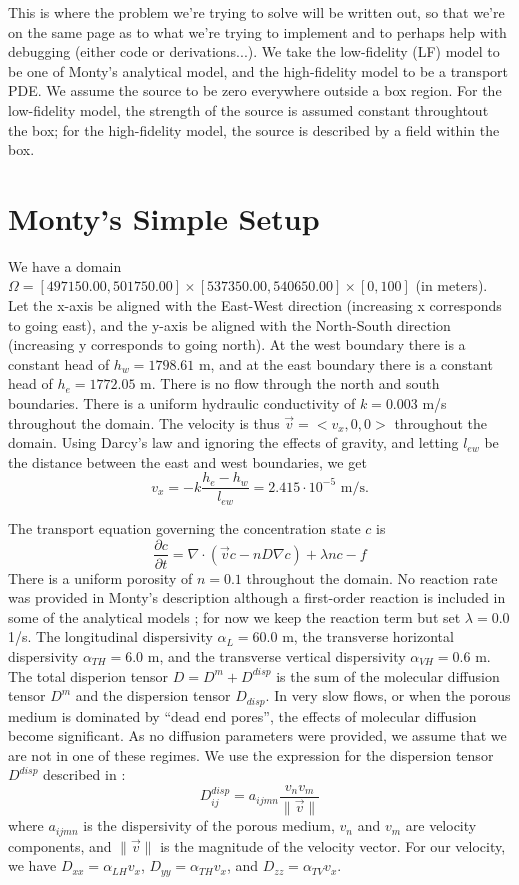 \documentclass[12pt, letterpaper]{article}
\begin{document}
This is where the problem we're trying to solve will be written out, so that we're on the same page as to what we're trying to implement and to perhaps help with debugging (either code or derivations...). We take the low-fidelity (LF) model to be one of Monty's analytical model, and the high-fidelity model to be a transport PDE. We assume the source to be zero everywhere outside a box region. For the low-fidelity model, the strength of the source is assumed constant throughtout the box; for the high-fidelity model, the source is described by a field within the box. 

\section{Monty's Simple Setup}

We have a domain $\Omega=[497150.00, 501750.00]\times[537350.00, 540650.00]\times[0,100]$ (in meters). Let the x-axis be aligned with the East-West direction (increasing x corresponds to going east), and the y-axis be aligned with the North-South direction (increasing y corresponds to going north). At the west boundary there is a constant head of $h_w=1798.61$ m, and at the east boundary there is a constant head of $h_e=1772.05$ m. There is no flow through the north and south boundaries. There is a uniform hydraulic conductivity of $k=0.003$ m/s throughout the domain. The velocity is thus $\vec{v}=<v_x,0,0>$ throughout the domain. Using Darcy's law and ignoring the effects of gravity, and letting $l_{ew}$ be the distance between the east and west boundaries, we get
\[
v_x=-k\frac{h_e-h_w}{l_{ew}}=2.415\cdot10^{-5}\textrm{ m/s}.
\]

The transport equation governing the concentration state $c$ is
\[
\frac{\partial c}{\partial t}=\nabla\cdot(\vec{v}c-nD\nabla c)+\lambda n c - f
\]
There is a uniform porosity of $n=0.1$ throughout the domain. No reaction rate was provided in Monty's description although a first-order reaction is included in some of the analytical models \cite{}; for now we keep the reaction term but set $\lambda=0.0$ 1/s. The longitudinal dispersivity $\alpha_L=60.0$ m, the transverse horizontal dispersivity $\alpha_{TH}=6.0$ m, and the transverse vertical dispersivity $\alpha_{VH}=0.6$ m. The total disperion tensor $D=D^m+D^{disp}$ is the sum of the molecular diffusion tensor $D^m$ and the dispersion tensor $D_{disp}$. In very slow flows, or when the porous medium is dominated by ``dead end pores'', the effects of molecular diffusion become significant. As no diffusion parameters were provided, we assume that we are not in one of these regimes. We use the expression for the dispersion tensor $D^{disp}$ described in \cite{}:
\[
D^{disp}_{ij}=a_{ijmn}\frac{v_n v_m}{\|\vec{v}\|}
\]
where $a_{ijmn}$ is the dispersivity of the porous medium, $v_n$ and $v_m$ are velocity components, and $\|\vec{v}\|$ is the magnitude of the velocity vector. For our velocity, we have $D_{xx}=\alpha_{LH}v_x$, $D_{yy}=\alpha_{TH}v_x$, and $D_{zz}=\alpha_{TV}v_x$. 
\end{document}

